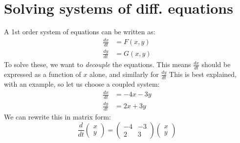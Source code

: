 \documentclass{article}
\begin{document}
\section{Solving systems of diff. equations}
A 1st order system of equations can be written as:
\begin{equation}
\begin{split}
\frac{dx}{dt} & = F(x, y) \\
\frac{dy}{dt} & = G(x, y)
\end{split}
\end{equation}
To solve these, we want to \emph{decouple} the equations. This means $ \frac{dx}{dt} $ should be expressed as a function of $ x $ alone, and similarly for $ \frac{dy}{dt} $
This is best explained, with an example, so let us choose a coupled system:
\begin{equation}
\begin{split}
\frac{dx}{dt} & = - 4x - 3y \\
\frac{dy}{dt} & = 2x + 3y
\end{split}
\end{equation}
We can rewrite this in matrix form:
\begin{equation}
\frac{d}{dt}
\begin{pmatrix}
x \\
y
\end{pmatrix}
=
\begin{pmatrix}
-4 & -3 \\
2 & 3
\end{pmatrix}
\begin{pmatrix}
x \\
y
\end{pmatrix}
\end{equation}
\end{document}
